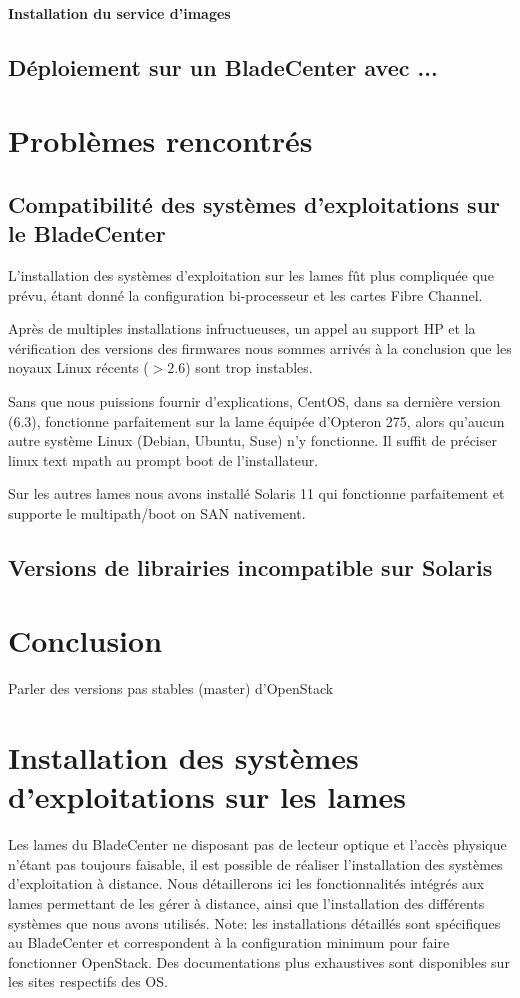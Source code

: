 \documentclass[a4paper,oneside]{report}
\begin{document}
\subsubsection{Installation du service d'images}

\section{Déploiement sur un BladeCenter avec ...}


\chapter{Problèmes rencontrés}
\section{Compatibilité des systèmes d'exploitations sur le BladeCenter}
\label{sec:compatblade}
L'installation des systèmes d'exploitation sur les lames fût plus compliquée que prévu, étant donné la configuration bi-processeur et les cartes Fibre Channel.

Après de multiples installations infructueuses, un appel au support HP et la vérification des versions des firmwares nous sommes arrivés à la conclusion que les noyaux Linux récents ($ > 2.6 $) sont trop instables.

Sans que nous puissions fournir d'explications, CentOS, dans sa dernière version (6.3), fonctionne parfaitement sur la lame équipée d'Opteron 275, alors qu'aucun autre système Linux (Debian, Ubuntu, Suse) n'y fonctionne.
Il suffit de préciser linux text mpath au prompt boot de l'installateur.

Sur les autres lames nous avons installé Solaris 11 qui fonctionne parfaitement et supporte le multipath/boot on SAN nativement.

\section{Versions de librairies incompatible sur Solaris}
\label{sec:libsolaris}

\chapter{Conclusion}
Parler des versions pas stables (master) d'OpenStack

\appendix
\chapter{Installation des systèmes d'exploitations sur les lames}
Les lames du BladeCenter ne disposant pas de lecteur optique et l'accès physique n'étant pas toujours faisable, il est possible de réaliser l'installation des systèmes d'exploitation à distance.
Nous détaillerons ici les fonctionnalités intégrés aux lames permettant de les gérer à distance, ainsi que l'installation des différents systèmes que nous avons utilisés.\newline
Note: les installations détaillés sont spécifiques au BladeCenter et correspondent à la configuration minimum pour faire fonctionner OpenStack. Des documentations plus exhaustives sont disponibles sur les sites respectifs des OS.
\end{document}

